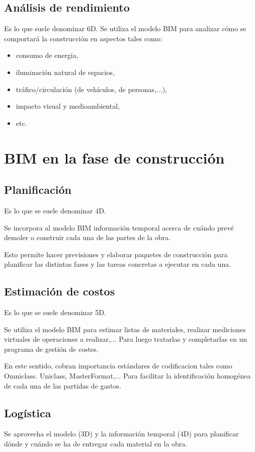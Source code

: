 \documentclass[spanish,12pt,a4paper,final,oneside]{book}
\begin{document}
\section{Análisis de rendimiento}
Es lo que suele denominar 6D. Se utiliza el modelo BIM para analizar cómo se comportará la construcción en aspectos tales como:
\begin{itemize}
\item consumo de energia,
\item iluminación natural de espacios,
\item tráfico/circulación (de vehículos, de personas,...),
\item impacto visual y medioambiental,
\item etc.
\end{itemize}

\chapter{BIM en la fase de construcción}

\section{Planificación}
Es lo que se suele denominar 4D. 

Se incorpora al modelo BIM información temporal acerca de cuándo prevé demoler o construir cada una de las partes de la obra.

Esto permite hacer previsiones y elaborar paquetes de construcción para planificar las distintas fases y las tareas concretas a ejecutar en cada una.

\section{Estimación de costos}
Es lo que se suele denominar 5D.

Se utiliza el modelo BIM para estimar listas de materiales, realizar mediciones virtuales de operaciones a realizar,... Para luego tratarlas y completarlas en un programa de gestión de costes.

En este sentido, cobran importancia estándares de codificacion tales como Omniclass. Uniclass, MasterFormat,... Para facilitar la identificación homogénea de cada una de las partidas de gastos. 

\section{Logística}
Se aprovecha el modelo (3D) y la información temporal (4D) para planificar dónde y cuándo se ha de entregar cada material en la obra.
\end{document}
